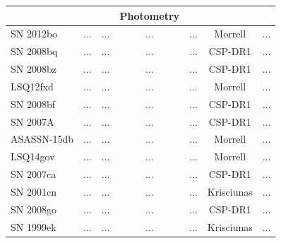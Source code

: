 \documentclass[11pt]{article}
\begin{document}
\begin{table}[htbp]
{\begin{tabular}{lcccccc}
    \hline

    &  &  & Photometry &  &  &  \\

    \hline

    SN 2012bo & $\dots$ & $\dots$ & $\dots$ & $\dots$ & Morrell
    & $\dots$ \\
    SN 2008bq & $\dots$ & $\dots$ & $\dots$ & $\dots$ & CSP-DR1 & $\dots$ \\
    SN 2008bz & $\dots$ & $\dots$ & $\dots$ & $\dots$ & CSP-DR1 & $\dots$ \\
    LSQ12fxd  & $\dots$ & $\dots$ & $\dots$ & $\dots$ & Morrell & $\dots$ \\
    SN 2008bf & $\dots$ & $\dots$ & $\dots$ & $\dots$ & CSP-DR1 & $\dots$ \\
    SN 2007A  & $\dots$ & $\dots$ & $\dots$ & $\dots$ & CSP-DR1 & $\dots$ \\
    ASASSN-15db & $\dots$ & $\dots$ & $\dots$ & $\dots$ & Morrell & $\dots$ \\
    LSQ14gov  & $\dots$ & $\dots$ & $\dots$ & $\dots$ & Morrell & $\dots$ \\
    SN 2007ca & $\dots$ & $\dots$ & $\dots$ & $\dots$ & CSP-DR1 & $\dots$ \\
    SN 2001cn & $\dots$ & $\dots$ & $\dots$ & $\dots$ & Krisciunas & $\dots$ \\
    SN 2008go & $\dots$ & $\dots$ & $\dots$ & $\dots$ & CSP-DR1 & $\dots$ \\
    SN 1999ek & $\dots$ & $\dots$ & $\dots$ & $\dots$ & Krisciunas & $\dots$ \\
    \hline
     
  \end{tabular}
}
\end{table}
\end{document}
